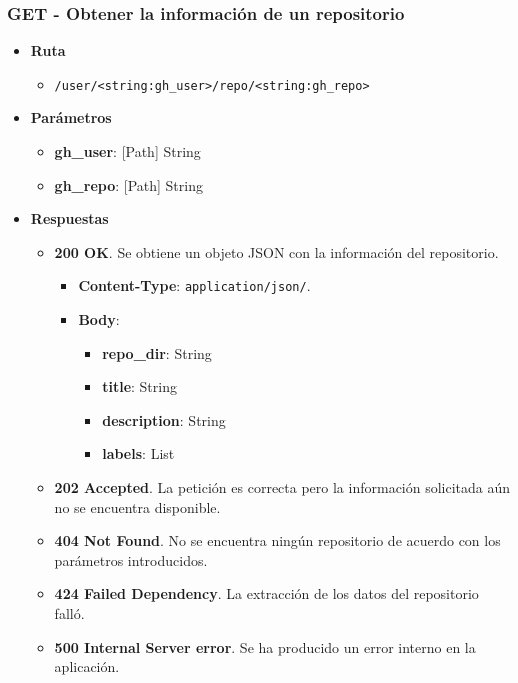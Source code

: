 \subsubsection{GET - Obtener la información de un repositorio}

\begin{itemize}
    \item[] \textbf{Ruta}
        \begin{itemize} \setlength\itemsep{0.2em}
            \item[] \texttt{/user/<string:gh\_user>/repo/<string:gh\_repo>}
        \end{itemize}
    \item[] \textbf{Parámetros}
        \begin{itemize} \setlength\itemsep{0.2em}
            \item[] \textbf{gh\_user}: [Path] String
            \item[] \textbf{gh\_repo}: [Path] String
        \end{itemize}
    \item[] \textbf{Respuestas}
        \begin{itemize} \setlength\itemsep{0.2em}
            \item[] \textbf{200 OK}. Se obtiene un objeto JSON con la información del repositorio.
                \begin{itemize} \setlength\itemsep{0.2em}
                    \item[] \textbf{Content-Type}: \texttt{application/json/}.
                    \item[] \textbf{Body}: 
                        \begin{itemize} \setlength\itemsep{0.2em}
                            \item[] \textbf{repo\_dir}: String
                            \item[] \textbf{title}: String
                            \item[] \textbf{description}: String
                            \item[] \textbf{labels}: List
                        \end{itemize}
                \end{itemize}
            \item[] \textbf{202 Accepted}. La petición es correcta pero la información solicitada aún no se encuentra disponible.
            \item[] \textbf{404 Not Found}. No se encuentra ningún repositorio de acuerdo con los parámetros introducidos.
            \item[] \textbf{424 Failed Dependency}. La extracción de los datos del repositorio falló.
            \item[] \textbf{500 Internal Server error}. Se ha producido un error interno en la aplicación.
        \end{itemize}
\end{itemize}

